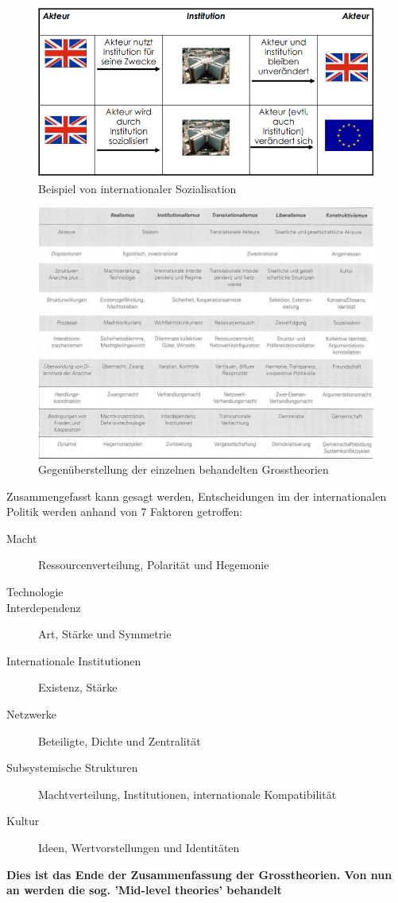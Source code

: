 \documentclass[a4paper, 11pt]{article}
\begin{document}
\begin{figure}[htb]
	\centering
	\includegraphics[keepaspectratio=true,height=15\baselineskip]{sozialisation.png}
	\caption{Beispiel von internationaler Sozialisation}
	\label{fig:sozialisation}
\end{figure}

\begin{landscape}
	\begin{figure}[htb]
		\centering
		\includegraphics[keepaspectratio=true,height=30\baselineskip]{Gegenueberstellung.png}
		\caption{Gegenüberstellung der einzelnen behandelten Grosstheorien}
		\label{fig:gegenueberstellung}
	\end{figure}
\end{landscape}

Zusammengefasst kann gesagt werden, Entscheidungen im der internationalen Politik werden anhand von 7 Faktoren getroffen:

\begin{description}
	\item [Macht] Ressourcenverteilung, Polarität und Hegemonie
	\item [Technologie]
	\item [Interdependenz] Art, Stärke und Symmetrie
	\item [Internationale Institutionen] Existenz, Stärke
	\item [Netzwerke] Beteiligte, Dichte und Zentralität
	\item [Subsystemische Strukturen] Machtverteilung, Institutionen, internationale Kompatibilität
	\item [Kultur] Ideen, Wertvorstellungen und Identitäten
\end{description}

\noindent \textbf{Dies ist das Ende der Zusammenfassung der Grosstheorien. Von nun an werden die sog. 'Mid-level theories' behandelt}

\vspace{10px}

\hrulefill
\end{document}
